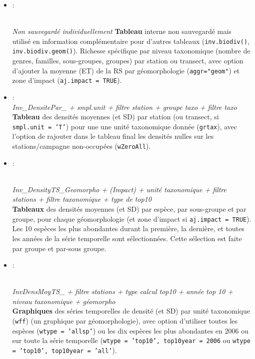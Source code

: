 \documentclass{article}
\begin{document}
\begin{itemize}
  \item[]  \hypertarget{i5}{:}\\
    \emph{Non sauvegardé individuellement}
    \textbf{Tableau} interne non sauvegardé mais utilisé en
    information complémentaire pour d'autres tableaux
    (\texttt{inv.biodiv()}, \texttt{inv.biodiv.geom()}). Richesse
    spécifique par niveau taxonomique (nombre de genres, familles, sous-groupes,
    groupes) par station ou transect, avec option d'ajouter la moyenne
    (ET) de la RS par géomorphologie (\texttt{aggr="geom"}) et zone
    d'impact (\texttt{aj.impact = TRUE}).

   \item[] \hypertarget{i6}{}:\\
\emph{Inv\_DensitePar\_ + smpl.unit + filtre station + groupe taxo + filtre taxo}\\
\textbf{Tableau} des densités moyennes (et SD) par station (ou
transect, si \texttt{smpl.unit = 'T'}) pour une
une unité taxonomique donnée (\texttt{grtax}), avec l'option de
rajouter dans le tableau final les densités nulles sur les
stations/campagne non-occupées (\texttt{wZeroAll}).

\item[] \hypertarget{i7}{:}\\
  \emph{Inv\_DensityTS\_Geomorpho + (Impact) + unité taxonomique +
    filtre stations + filtre taxonomique + type de top10}\\
  \textbf{Tableaux} des densités moyennes (et SD) par espèce, par
  sous-groupe et par groupe, pour chaque géomorphologie (et zone
  d'impact si \texttt{aj.impact = TRUE}). Les 10 espèces les plus
  abondantes durant la première, la
  dernière, et toutes les années de la série temporelle sont
  sélectionnées. Cette sélection est faite par groupe et par-sous
  groupe.

\item[] \hypertarget{i8}{:}\\
  \emph{InvDensMoyTS\_ + filtre stations + type calcul top10 + année
    top 10 + niveau taxonomique + géomorpho} \\
  \textbf{Graphiques} des séries temporelles de densité (et SD) par
  unité taxonomique (\texttt{wff}) (un graphique par géomorphologie),
  avec option d'utiliser toutes les espèces (\texttt{wtype = 'allsp'})
  ou les dix espèces les plus abondantes en 2006 ou sur toute la série
  temporelle (\texttt{wtype = 'top10', top10year = 2006} ou
  \texttt{wtype = 'top10', top10year = 'all'}).



\end{itemize}
\end{document}
